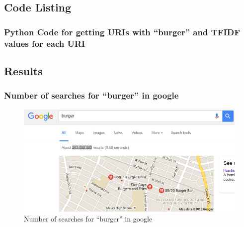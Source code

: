 \subsection{Code Listing}

\subsubsection{Python Code for getting URIs with ``burger'' and TFIDF values for each URI}

\newpage

\subsection{Results}

\subsubsection{Number of searches for ``burger'' in google}
\begin{figure}[ht]    
    \begin{center}
        \includegraphics[scale=0.4]{burger_in_google.png}
        \caption{Number of searches for ``burger'' in google}
        \label{Number of searches for ``burger'' in google}
    \end{center}
\end{figure}

